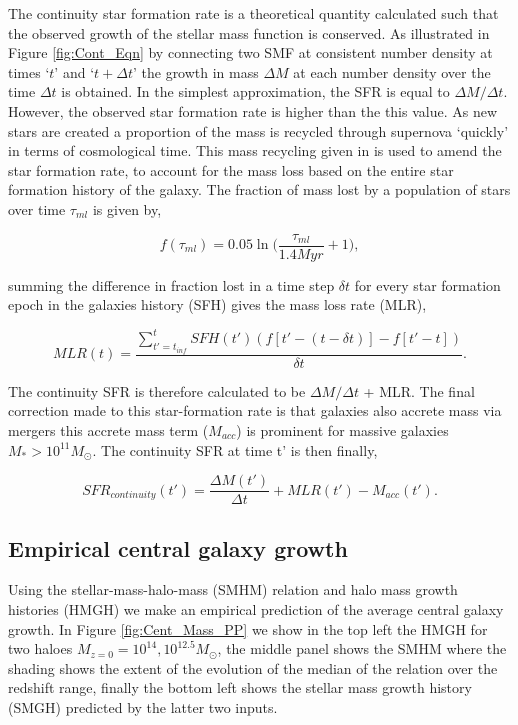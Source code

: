 The continuity star formation rate is a theoretical quantity calculated such that the observed growth of the stellar mass function is conserved. As illustrated in Figure \ref{fig:Cont_Eqn} by connecting two SMF at consistent number density at times `$t$' and `$t + \Delta t$' the growth in mass $\Delta M$ at each number density over the time $\Delta t$ is obtained. In the simplest approximation, the SFR is equal to $\Delta M / \Delta t$. However, the observed star formation rate is higher than the this value. As new stars are created a proportion of the mass is recycled through supernova `quickly' in terms of cosmological time. This mass recycling given in \citet{Moster2018Emerge10} is used to amend the star formation rate, to account for the mass loss based on the entire star formation history of the galaxy. The fraction of mass lost by a population of stars over time $\tau_{ml}$ is given by,

\begin{equation}
\label{eqn:f_ml}
f(\tau_{ml}) = 0.05 \ln \Big(\frac{\tau_{ml}}{1.4 Myr}+1\Big),
\end{equation}

summing the difference in fraction lost in a time step $\delta t$ for every star formation epoch in the galaxies history (SFH) gives the mass loss rate (MLR), 

\begin{equation}
\label{eqn:MLR}
MLR(t) = \frac{ \sum_{t' = t_{inf}}^{t} SFH(t')(f[t' - (t-\delta t)]-f[t' - t]) }{\delta t}.
\end{equation}

The continuity SFR is therefore calculated to be $\Delta M / \Delta t$ + MLR. The final correction made to this star-formation rate is that galaxies also accrete mass via mergers this accrete mass term ($M_{acc}$) is prominent for massive galaxies $M_* > 10^{11} M_{\odot}$. The continuity SFR at time t' is then finally,

\begin{equation}
    SFR_{continuity}(t') = \frac{\Delta M(t')}{\Delta t} + MLR(t') - M_{acc}(t').
\end{equation}

\subsection{Empirical central galaxy growth}

Using the stellar-mass-halo-mass (SMHM) relation and halo mass growth histories (HMGH) we make an empirical prediction of the average central galaxy growth. In Figure \ref{fig:Cent_Mass_PP} we show in the top left the HMGH for two haloes $M_{z=0} = 10^{14}, 10^{12.5} M_{\odot}$, the middle panel shows the SMHM where the shading shows the extent of the evolution of the median of the relation over the redshift range, finally the bottom left shows the stellar mass growth history (SMGH) predicted by the latter two inputs.

